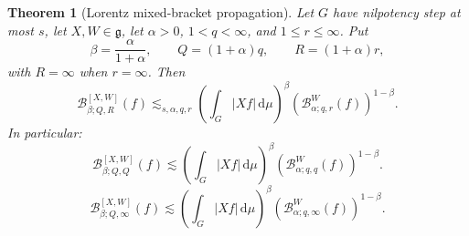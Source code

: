 \documentclass[11pt]{article}
\newtheorem{theorem}{Theorem}[section]
\theoremstyle{definition}
\theoremstyle{remark}
\newcommand{\g}{\mathfrak g}
\newcommand{\dd}{\,\mathrm d}
\newcommand{\abs}[1]{\lvert #1\rvert}
\newcommand{\B}[4]{\mathcal B^{#1}_{#2;#3,#4}}
\newcommand{\Bw}[3]{\mathcal B^{#1}_{#2;#3,\infty}}
\newcommand{\less}{\lesssim}
\begin{document}
\begin{theorem}[Lorentz mixed-bracket propagation]\label{thm:lorentz-mixed}
Let \(G\) have nilpotency step at most \(s\), let \(X,W\in\g\), let \(\alpha>0\),
\(1<q<\infty\), and \(1\le r\le\infty\).  Put
\begin{equation}\label{eq:betaQ}
 \beta=\frac{\alpha}{1+\alpha},\qquad Q=(1+\alpha)q,
 \qquad R=(1+\alpha)r,
\end{equation}
with \(R=\infty\) when \(r=\infty\).  Then
\begin{equation}\label{eq:lorentz-mixed}
 \B{[X,W]}{\beta}{Q}{R}(f)
 \less_{s,\alpha,q,r}
 \left(\int_G\abs{Xf}\dd\mu\right)^\beta
 \left(\B{W}{\alpha}{q}{r}(f)\right)^{1-\beta}.
\end{equation}
In particular:
\begin{equation}\label{eq:strongmixed}
 \B{[X,W]}{\beta}{Q}{Q}(f)
 \less
 \left(\int_G\abs{Xf}\dd\mu\right)^\beta
 \left(\B{W}{\alpha}{q}{q}(f)\right)^{1-\beta}.
\end{equation}
\begin{equation}\label{eq:weakmixed}
 \Bw{[X,W]}{\beta}{Q}(f)
 \less
 \left(\int_G\abs{Xf}\dd\mu\right)^\beta
 \left(\Bw{W}{\alpha}{q}(f)\right)^{1-\beta}.
\end{equation}
\end{theorem}
\end{document}
